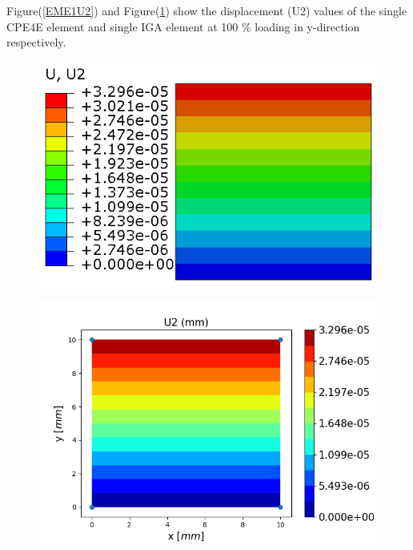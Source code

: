\documentclass[12pt]{article}
\begin{document}
\noindent
Figure(\ref{EME1U2}) and Figure(\ref{EME1U2_IGA}) show the displacement (U2) values of the single CPE4E element and single IGA element at 100 \% loading in y-direction respectively. \\
\begin{figure}[H]
	\centering
	\begin{minipage}{.5\textwidth}
		\centering
		\includegraphics[width=1\linewidth]{EME1U2.png}
		\label{EME1U2}
	\end{minipage}%
	\begin{minipage}{.55\textwidth}
		\centering
		\includegraphics[width=1\linewidth]{EME1U2_IGA.png}
		\label{EME1U2_IGA}
	\end{minipage}
\end{figure}
\end{document}
